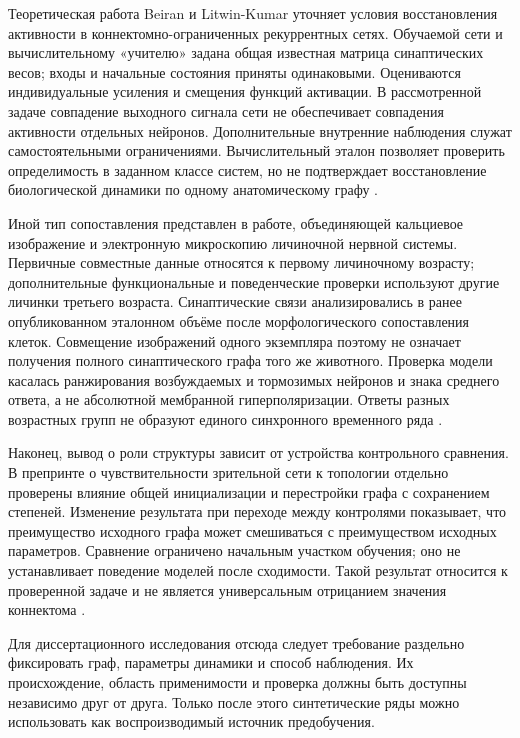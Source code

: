 Теоретическая работа Beiran и Litwin-Kumar уточняет условия восстановления активности в коннектомно-ограниченных рекуррентных сетях. Обучаемой сети и вычислительному «учителю» задана общая известная матрица синаптических весов; входы и начальные состояния приняты одинаковыми. Оцениваются индивидуальные усиления и смещения функций активации. В рассмотренной задаче совпадение выходного сигнала сети не обеспечивает совпадения активности отдельных нейронов. Дополнительные внутренние наблюдения служат самостоятельными ограничениями. Вычислительный эталон позволяет проверить определимость в заданном классе систем, но не подтверждает восстановление биологической динамики по одному анатомическому графу \cite{s743}.

Иной тип сопоставления представлен в работе, объединяющей кальциевое изображение и электронную микроскопию личиночной нервной системы. Первичные совместные данные относятся к первому личиночному возрасту; дополнительные функциональные и поведенческие проверки используют другие личинки третьего возраста. Синаптические связи анализировались в ранее опубликованном эталонном объёме после морфологического сопоставления клеток. Совмещение изображений одного экземпляра поэтому не означает получения полного синаптического графа того же животного. Проверка модели касалась ранжирования возбуждаемых и тормозимых нейронов и знака среднего ответа, а не абсолютной мембранной гиперполяризации. Ответы разных возрастных групп не образуют единого синхронного временного ряда \cite{s212}.

Наконец, вывод о роли структуры зависит от устройства контрольного сравнения. В препринте о чувствительности зрительной сети к топологии отдельно проверены влияние общей инициализации и перестройки графа с сохранением степеней. Изменение результата при переходе между контролями показывает, что преимущество исходного графа может смешиваться с преимуществом исходных параметров. Сравнение ограничено начальным участком обучения; оно не устанавливает поведение моделей после сходимости. Такой результат относится к проверенной задаче и не является универсальным отрицанием значения коннектома \cite{s741}.

Для диссертационного исследования отсюда следует требование раздельно фиксировать граф, параметры динамики и способ наблюдения. Их происхождение, область применимости и проверка должны быть доступны независимо друг от друга. Только после этого синтетические ряды можно использовать как воспроизводимый источник предобучения.

